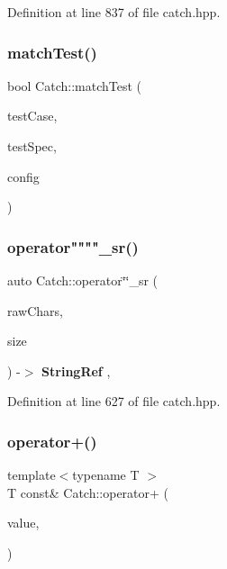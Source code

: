 Definition at line 837 of file catch.\+hpp.

\mbox{\label{namespace_catch_aadef80fbc6bc84589777a462770cef49}} 
\subsubsection{matchTest()}
{\footnotesize\ttfamily bool Catch\+::match\+Test (\begin{DoxyParamCaption}\item[{\textbf{ Test\+Case} const \&}]{test\+Case,  }\item[{Test\+Spec const \&}]{test\+Spec,  }\item[{\textbf{ I\+Config} const \&}]{config }\end{DoxyParamCaption})}

\mbox{\label{namespace_catch_a56dcfbb436fa40d778e784bf862e78a6}} 
\subsubsection{operator""""\_sr()}
{\footnotesize\ttfamily auto Catch\+::operator\char`\"{}\char`\"{}\+\_\+sr (\begin{DoxyParamCaption}\item[{char const $\ast$}]{raw\+Chars,  }\item[{std\+::size\+\_\+t}]{size }\end{DoxyParamCaption}) -\/$>$ \textbf{ String\+Ref} \hspace{0.3cm}{\ttfamily [inline]}, {\ttfamily [noexcept]}}



Definition at line 627 of file catch.\+hpp.

\mbox{\label{namespace_catch_a5e95b3c47a7618db3649dc39b0bb9004}} 
\subsubsection{operator+()\hspace{0.1cm}{\footnotesize\ttfamily [1/4]}}
{\footnotesize\ttfamily template$<$typename T $>$ \\
T const\& Catch\+::operator+ (\begin{DoxyParamCaption}\item[{T const \&}]{value,  }\item[{\textbf{ Stream\+End\+Stop}}]{ }\end{DoxyParamCaption})}



